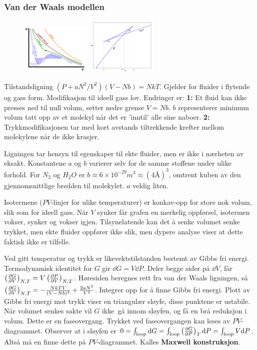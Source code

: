 \documentclass[12pt]{article}
\begin{document}
\subsubsection{Van der Waals modellen}
\begin{figure}
  \includegraphics[width=0.3\textwidth]{figures/pV-vdW.png}
  \includegraphics[width=0.3\textwidth]{figures/Van_der_Waals_GibbsP.png}
\end{figure}
Tilstandsligning $(P + aN^2 / V^2) (V-Nb) = NkT$. Gjelder for fluider i flytende og gass form.
Modifikasjon til ideell gass lov. Endringer er: \textbf{1:} Et fluid kan ikke presses ned til null
volum, setter nedre grense $V = Nb$. $b$ representerer minimum volum tatt opp av et molekyl
når det er 'inntil' alle sine naboer. \textbf{2:} Trykkmodifikasjonen tar med kort avstands
tiltrekkende krefter mellom molekylene når de ikke krasjer.

Ligningen tar hensyn til egenskaper til ekte fluider, men er ikke i nærheten av eksakt. Konstantene $a$ og $b$
varierer selv for de samme stoffene under ulike forhold. For $N_2$ og $H_2 O$ er $b \approx 6 \times 10^{-29} m^3 \approx (4 \text{Å})^3$,
omtrent kuben av den gjennomsnittlige bredden til molekylet. $a$ veldig liten.

Isotermene ($PV$-linjer for ulike temperaturer) er konkav-opp for store nok volum,
slik som for ideell gass. Når $V$ synker får grafen en merkelig oppførsel, isotermen
vokser, synker og vokser igjen. Tilsynelatende kan det å senke volumet senke trykket,
men ekte fluider oppfører ikke slik, men dypere analyse viser at dette faktisk ikke
er tilfelle.

Ved gitt temperatur og trykk er likevektstilstanden bestemt av Gibbs fri energi. Termodynamisk identitet for $G$ gir $\dd G = V \dd P$. Deler begge sider på $\dd V$, får
$\left( \pdv{G}{V} \right)_{N,T} = V\left( \pdv{P}{V} \right)_{N,T}$. Høresiden beregnes rett fra van der Waals ligningen, så $\left( \pdv{G}{V} \right)_{N,T} = - \frac{NkTV}{(V-Nb)^2} + \frac{2aN^2}{V^2}$.
Integrer opp for å finne Gibbs fri energi. Plott av Gibbs fri energi mot trykk viser en triangulær sløyfe,
disse punktene er ustabile. Når volumet senkes sakte vil $G$ ikke gå innom sløyfen, og få en brå reduksjon i volum.
Dette er en faseovergang. Trykket ved faseovergangen kan leses av $PV$-diagrammet. Observer at i sløyfen er
$0 = \int_\text{loop} \dd G = \int_\text{loop} \left( \pdv{G}{P} \right)_{T} \dd P = \int_\text{loop} V\dd P$.
Altså må en finne dette på $PV$-diagrammet. Kalles \textbf{Maxwell konstruksjon}.
\end{document}
